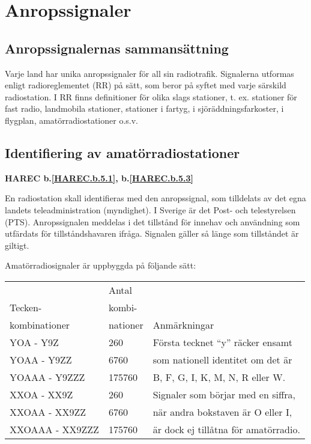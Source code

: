 \section{Anropssignaler}

\subsection{Anropssignalernas sammansättning}

Varje land har unika anropssignaler för all sin
radiotrafik. Signalerna utformas enligt radioreglementet (RR) på sätt,
som beror på syftet med varje särskild radiostation. I RR finns
definitioner för olika slags stationer, t. ex. stationer för fast
radio, landmobila stationer, stationer i fartyg, i
sjöräddningsfarkoster, i flygplan, amatörradiostationer o.s.v.

\subsection{Identifiering av amatörradiostationer}
\textbf{
HAREC b.\ref{HAREC.b.5.1}\label{myHAREC.b.5.1},
 b.\ref{HAREC.b.5.3}\label{myHAREC.b.5.3}
}

En radiostation skall identifieras med den anropssignal, som
tilldelats av det egna landets teleadministration (myndighet). I Sverige
är det Post- och telestyrelsen (PTS).  Anropssignalen meddelas i det
tillstånd för innehav och användning som utfärdats för
tillståndshavaren ifråga. Signalen gäller så länge som tillståndet är
giltigt.

Amatörradiosignaler är uppbyggda på följande sätt:

\begin{tabular}{l|l|l}
                & Antal    &  \\
  Tecken-       & kombi-   &  \\
  kombinationer & nationer & Anmärkningar \\
  \hline
  YOA - Y9Z &
  260 &
  Första tecknet ``y'' räcker ensamt
  \\
  YOAA - Y9ZZ &
  6760 &
  som nationell identitet om det är
  \\
  YOAAA - Y9ZZZ &
  175760 &
  B, F, G, I, K, M, N, R eller W.
  \\
  \hline
  XXOA - XX9Z &
  260 &
  Signaler som börjar med en siffra,
  \\
  XXOAA - XX9ZZ &
  6760 &
  när andra bokstaven är O eller I,
  \\
  XXOAAA - XX9ZZZ &
  175760 &
  är dock ej tillåtna för amatörradio.
  \\
\end{tabular}

